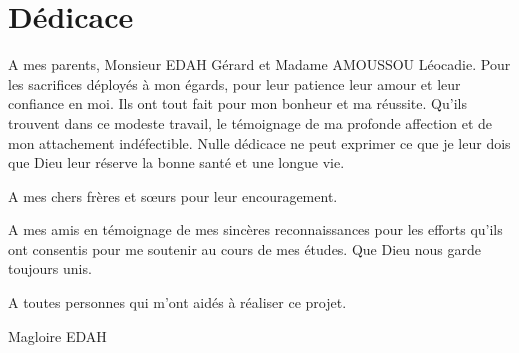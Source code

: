 \chapter{Dédicace}
A
mes parents, Monsieur EDAH Gérard et Madame AMOUSSOU Léocadie.
Pour les sacrifices déployés à mon égards, pour leur
patience leur amour et leur confiance en moi.
Ils ont tout fait pour mon bonheur et ma réussite.
Qu'ils trouvent dans ce modeste travail, le témoignage de
ma profonde affection et de mon attachement
indéfectible. Nulle dédicace ne peut exprimer ce que je
leur dois que Dieu leur réserve la bonne santé et une
longue vie.


A mes chers frères et sœurs pour leur encouragement.


A mes amis
en témoignage de mes sincères reconnaissances pour les
efforts qu'ils ont consentis pour me soutenir au cours de
mes études. Que Dieu nous garde toujours unis.

A toutes personnes qui m'ont aidés à réaliser ce projet.

Magloire EDAH